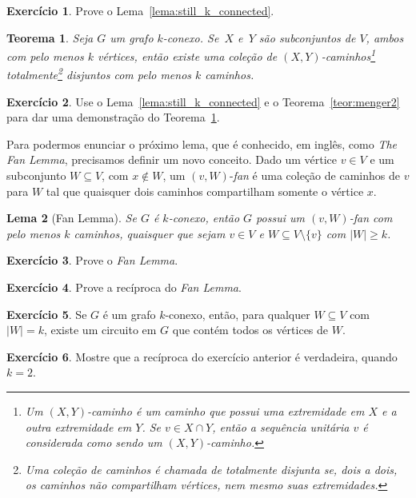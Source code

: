 \documentclass[12pt, a4paper]{article}
\newtheorem{teor}{Teorema}[section]
\newtheorem{lema}[teor]{Lema}
\theoremstyle{definition}
\newtheorem{exer}{Exercício}
\begin{document}
\begin{exer}
  Prove o Lema~\ref{lema:still_k_connected}.
\end{exer}

\begin{teor}
  \label{teor:menger3}
  Seja $G$ um grafo $k$-conexo. Se~$X$ e~$Y$ são subconjuntos de $V$, ambos com pelo menos $k$ vértices, então existe uma coleção de $(X,Y)$-caminhos\footnote{Um $(X,Y)$-caminho é um caminho que possui uma extremidade em $X$ e a outra extremidade em $Y$. Se $v \in X \cap Y$, então a sequência unitária $v$ é considerada como sendo um $(X,Y)$-caminho.} totalmente\footnote{Uma coleção de caminhos é chamada de totalmente disjunta se, dois a dois, os caminhos não compartilham vértices, nem mesmo suas extremidades.} disjuntos com pelo menos $k$ caminhos.
\end{teor}

\begin{exer}
  Use o Lema~\ref{lema:still_k_connected} e o Teorema~\ref{teor:menger2} para dar uma demonstração do Teorema~\ref{teor:menger3}.
\end{exer}

Para podermos enunciar o próximo lema, que é conhecido, em inglês, como \emph{The Fan Lemma}, precisamos definir um novo conceito. Dado um vértice $v \in V$ e um subconjunto $W \subseteq V$, com $x \not\in W$, um $(v,W)$-\emph{fan} é uma coleção de caminhos de $v$ para $W$ tal que quaisquer dois caminhos compartilham somente o vértice $x$. 

\begin{lema}[Fan Lemma]
  \label{lema:fan}
  Se $G$ é $k$-conexo, então $G$ possui um $(v,W)$-fan com pelo menos $k$ caminhos, quaisquer que sejam $v \in V$ e $W \subseteq V \setminus \{v\}$ com $|W| \geq k$.
\end{lema}

\begin{exer}
  Prove o \emph{Fan Lemma}.
\end{exer}

\begin{exer}
  Prove a recíproca do \emph{Fan Lemma}.
\end{exer}

\begin{exer}
  Se $G$ é um grafo $k$-conexo, então, para qualquer $W \subseteq V$ com
  $|W| = k$, existe um circuito em $G$ que contém
  todos os vértices de $W$.
\end{exer}

\begin{exer}
  Mostre que a recíproca do exercício anterior é verdadeira, quando $k = 2$.
\end{exer}
\end{document}

